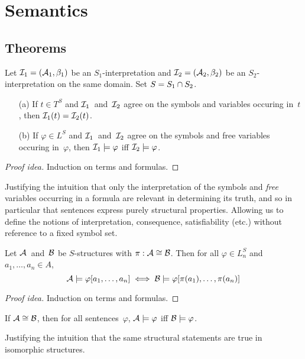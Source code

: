 %
%
%
\section{Semantics}
\subsection*{Theorems}
\begin{thm}[Coincidence]
Let \(\mathcal{I}_1=(\mathcal{A}_1,\beta_1)\) be an \(S_1\)-interpretation and \(\mathcal{I}_2=(\mathcal{A}_2,\beta_2)\) be an \(S_2\)-interpretation on the same domain. Set \(S=S_1\cap S_2\).
\begin{enumerate}[itemsep=0pt]
\item[(a)] If \(t\in T^S\) and \(\mathcal{I}_1\)~and~\(\mathcal{I}_2\) agree on the symbols and variables occuring in~\(t\), then \(\mathcal{I}_1(t)=\mathcal{I}_2(t)\).
\item[(b)] If \(\varphi\in L^S\) and \(\mathcal{I}_1\)~and~\(\mathcal{I}_2\) agree on the symbols and free variables occuring in~\(\varphi\), then \(\mathcal{I}_1\models\varphi\) iff \(\mathcal{I}_2\models\varphi\).
\end{enumerate}
\end{thm}
\begin{proof}[Proof idea]
Induction on terms and formulas.
\end{proof}
\begin{app}
Justifying the intuition that only the interpretation of the symbols and \emph{free} variables occurring in a formula are relevant in determining its truth, and so in particular that sentences express purely structural properties. Allowing us to define the notions of interpretation, consequence, satisfiability (etc.) without reference to a fixed symbol set.
\end{app}

\begin{thm}[Isomorphism]
Let \(\mathcal{A}\)~and~\(\mathcal{B}\) be \(S\)-structures with \(\pi:\mathcal{A}\cong\mathcal{B}\). Then for all \(\varphi\in L_n^S\) and \(a_1,\ldots,a_n\in A\),
\[\mathcal{A}\models\varphi[a_1,\ldots,a_n]\iff\mathcal{B}\models\varphi[\pi(a_1),\ldots,\pi(a_n)]\]
\end{thm}
\begin{proof}[Proof idea]
Induction on terms and formulas.
\end{proof}
\begin{cor}
If \(\mathcal{A}\cong\mathcal{B}\), then for all sentences~\(\varphi\), \(\mathcal{A}\models\varphi\) iff \(\mathcal{B}\models\varphi\).
\end{cor}
\begin{app}
Justifying the intuition that the same structural statements are true in isomorphic structures.
\end{app}

